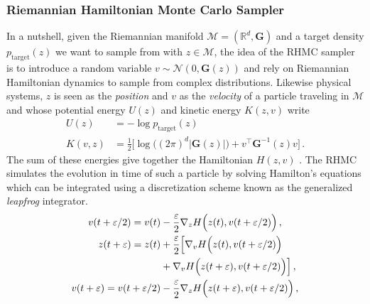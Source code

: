 \documentclass[10pt,journal,compsoc]{IEEEtran}
\begin{document}
    \subsubsection{Riemannian Hamiltonian Monte Carlo Sampler}
    In a nutshell, given the Riemannian manifold $\mathcal{M}=(\mathbb{R}^d, \mathbf{G})$ and a target density $p_{\mathrm{target}}(z)$ we want to sample from with $z \in \mathcal{M}$, the idea of the RHMC sampler is to introduce a random variable $v \sim \mathcal{N}(0, \mathbf{G}(z))$ and rely on Riemannian Hamiltonian dynamics to sample from complex distributions. Likewise physical systems, $z$ is seen as the \emph{position} and $v$ as the \emph{velocity} of a particle traveling in $\mathcal{M}$ and whose potential energy $U(z)$ and kinetic energy $K(z, v)$ write 
    \begin{equation*}
    \begin{aligned}
         U(z) &= - \log p_{\mathrm{target}}(z)\\
         K(v, z)&= \frac{1}{2}\Big[\log\big( (2\pi)^d|\mathbf{G}(z)|\big )+ v^{\top} \textbf{G}^{-1}(z)v \Big ]\,.
    \end{aligned}
    \end{equation*}
     The sum of these energies give together the Hamiltonian $H(z, v)$ \cite{duane_hybrid_1987,leimkuhler_simulating_2004}. The RHMC simulates the evolution in time of such a particle by solving Hamilton's equations which can be integrated using a discretization scheme known as the generalized \emph{leapfrog} integrator.
     \begin{equation}\label{Eq: Riemann Stormer Verlet}
        \begin{aligned}
            v(t + \varepsilon/2) = v(t) &- \frac{\varepsilon}{2} \nabla_z H\Bigl(z(t), v(t+\varepsilon/2)\Bigr)\,,\\
            z(t + \varepsilon)      = z(t) &+ \frac{\varepsilon}{2} \Bigl[\nabla_{v} H\Bigl(z(t), v(t + \varepsilon/2)\Bigr) \\&+ \nabla_{v} H\Bigl(z(t+\varepsilon),  v(t + \varepsilon/2)\Bigr)\Bigr]\,,\\
            v(t + \varepsilon)   = v(t + \varepsilon/2) &- \frac{\varepsilon}{2} \nabla_z H \Bigl(z(t+\varepsilon), v(t+ \varepsilon/2) \Bigr)\,,
        \end{aligned}
    \end{equation}
\end{document}
